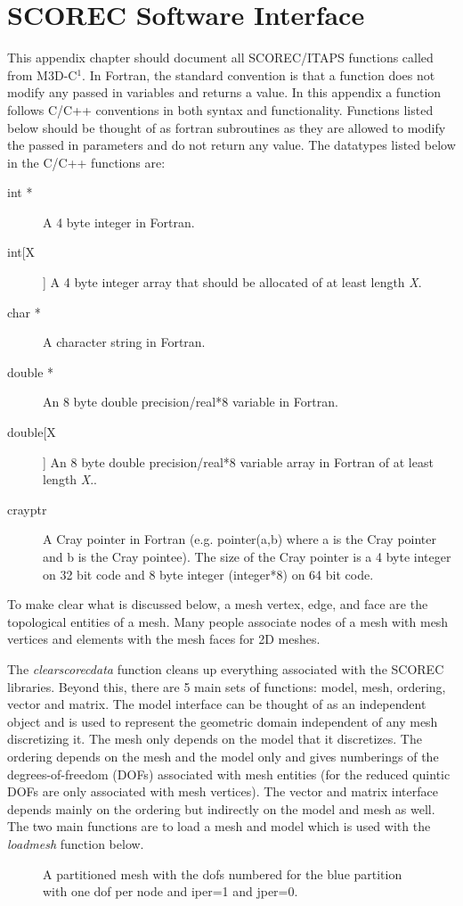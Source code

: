 \appendix
\chapter{SCOREC Software Interface}
This appendix chapter should document all SCOREC/ITAPS functions called from M3D-C$^1$. 
  In Fortran, the standard convention
is that a function does not modify any passed in variables and returns a value. 
In this appendix a function follows C/C++ conventions in both syntax and functionality. 
Functions listed below should be thought of as fortran subroutines as they are allowed
to modify the passed in parameters and do not return any value. 
The datatypes listed below in the C/C++ functions are:
\begin{description}
\item[int *] A 4 byte integer in Fortran.
\item[int[X]] A 4 byte integer array that should be allocated of at least length \textit{X}.
\item[char *] A character string in Fortran.
\item[double *] An 8 byte double precision/real*8 variable in Fortran.
\item[double[X]]  An 8 byte double precision/real*8 variable array in Fortran of at least length \textit{X}..
\item[crayptr] A Cray pointer in Fortran (e.g. pointer(a,b) where a is the Cray pointer and b is the Cray 
pointee).  The size of the Cray pointer is a 4 byte integer on 32 bit code and 8 byte integer (integer*8)
on 64 bit code.  
\end{description}
To make clear what is discussed below, a mesh vertex, edge, and face are the topological
entities of a mesh.  Many people associate nodes of a mesh with mesh vertices and elements with
the mesh faces for 2D meshes.  

The \textit{clearscorecdata} function cleans up everything associated with the SCOREC libraries.
Beyond this, there are 5 main sets of functions: model, mesh, ordering, vector and matrix.  The model
interface can be thought of as an independent object and is used to represent the geometric domain independent
of any mesh discretizing it.  The mesh only depends on the model that it discretizes.  The ordering
depends on the mesh and the model only and gives numberings of the degrees-of-freedom (DOFs) associated
with mesh entities (for the reduced quintic DOFs are only associated with mesh vertices).  The vector
and matrix interface depends mainly on the ordering but indirectly on the model and mesh as well.
 The two main functions
are to load a mesh and model which is used with the \textit{loadmesh} function below.  
\begin{center}
\begin{figure}
\centerline{} %
\caption{A partitioned mesh with the dofs numbered for the blue partition with one dof per node and iper=1 and jper=0.}\label{meshpartition} \end{figure}
\end{center}


